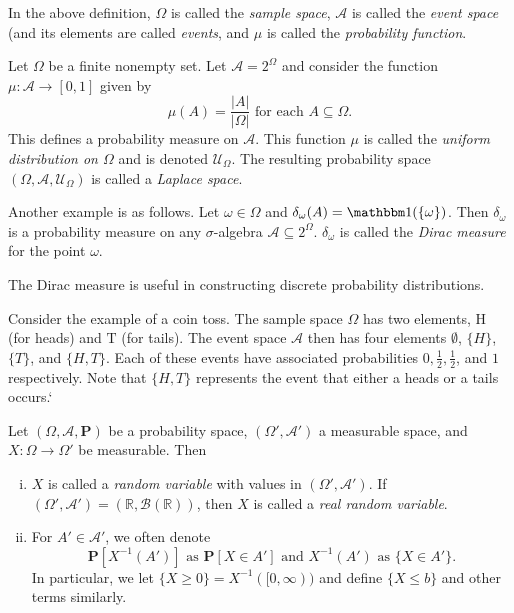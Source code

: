 In the above definition, $\Omega$ is called the \textit{sample space}, $\mathcal{A}$ is called the \textit{event space} (and its elements are called \textit{events}, and $\mu$ is called the \textit{probability function}.

\vspace{2mm}
Let $\Omega$ be a finite nonempty set. Let $\mathcal{A}=2^\Omega$ and consider the function $\mu:\mathcal{A}\to[0,1]$ given by
$$\mu(A)=\frac{|A|}{|\Omega|}\text{ for each $A\subseteq\Omega$.}$$
This defines a probability measure on $\mathcal{A}$. This function $\mu$ is called the \textit{uniform distribution on $\Omega$} and is denoted $\mathcal{U}_\Omega$. The resulting probability space $(\Omega,\mathcal{A},\mathcal{U}_\Omega)$ is called a \textit{Laplace space}.

\vspace{2mm}
Another example is as follows. Let $\omega\in\Omega$ and $\delta_\omega(A)=\indic(\{\omega\})$. Then $\delta_\omega$ is a probability measure on any $\sigma$-algebra $\mathcal{A}\subseteq2^\Omega$. $\delta_\omega$ is called the \textit{Dirac measure} for the point $\omega$.

The Dirac measure is useful in constructing discrete probability distributions.

\vspace{2mm}
Consider the example of a coin toss. The sample space $\Omega$ has two elements, $\text{H}$ (for heads) and $\text{T}$ (for tails). The event space $\mathcal{A}$ then has four elements $\emptyset$, $\{H\}$, $\{T\}$, and $\{H,T\}$. Each of these events have associated probabilities $0,\frac{1}{2},\frac{1}{2}$, and $1$ respectively. Note that $\{H,T\}$ represents the event that either a heads or a tails occurs.`

\begin{definition}
    Let $(\Omega,\mathcal{A},\textbf{P})$ be a probability space, $(\Omega',\mathcal{A}')$ a measurable space, and $X:\Omega\to\Omega'$ be measurable. Then
    \begin{enumerate}[(i)]
        \item $X$ is called a \textit{random variable} with values in $(\Omega',\mathcal{A}')$. If $(\Omega',\mathcal{A}')=(\mathbb{R},\mathcal{B}(\mathbb{R}))$, then $X$ is called a \textit{real random variable}.
        
        \item For $A'\in\mathcal{A}'$, we often denote
        $$\textbf{P}[X^{-1}(A')]\text{ as }\textbf{P}[X\in A']\text{ and } X^{-1}(A')\text{ as }\{X\in A'\}.$$
        In particular, we let $\{X\geq 0\}=X^{-1}([0,\infty))$ and define $\{X\leq b\}$ and other terms similarly.
    \end{enumerate}
\end{definition}

